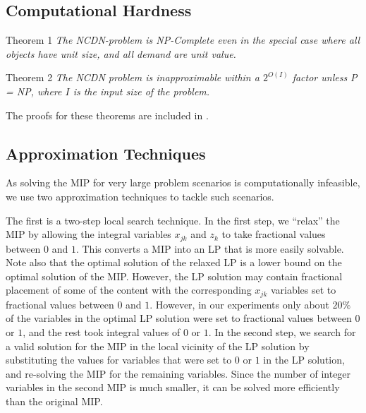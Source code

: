 \subsection{Computational Hardness}
{{\sc Theorem 1}} {\em The NCDN-problem is NP-Complete even in the special case where all objects have unit size, and all demand are unit value.}


{{\sc Theorem 2}} {\em  The NCDN problem is inapproximable within a $2^{O(I)}$ factor unless P = NP, where $I$ is the input size of the problem.}

The proofs for these theorems are included in \cite{techreport}.



\subsection{Approximation Techniques}
\label{sec:approx}

As solving the MIP for very large problem scenarios is computationally infeasible, we use two approximation techniques to tackle such scenarios. 

The first is a two-step local search technique. In the first step, we ``relax'' the MIP  by allowing the integral variables $x_{jk}$ and $z_k$ to take fractional values between $0$ and $1$. This converts a MIP into an LP that is more easily solvable. Note also that the optimal solution of the relaxed LP is a lower bound on the optimal solution of the MIP.  However, the LP solution may contain fractional placement of some of the content with the corresponding $x_{jk}$ variables set to fractional values between $0$ and $1$.  However, in our experiments only about $20\%$ of the variables in the optimal LP solution were set to fractional values between $0$ or $1$, and the rest took integral values of $0$ or $1$.  In the second step, we search for a valid solution for the MIP in the local vicinity of the LP solution by substituting the values for variables that were set to $0$ or $1$ in the LP solution, and re-solving the MIP for the remaining variables. Since the number of integer variables in the second MIP is much smaller, it can be solved more efficiently than the original MIP. 




